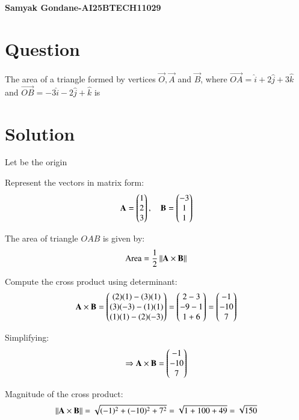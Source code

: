 \documentclass{article}
\begin{document}
\begin{center}
\large
    \textbf{Samyak Gondane-AI25BTECH11029}
\end{center}
\date{}

\section*{Question}
The area of a triangle formed by vertices $\vec{O}, \vec{A}$ and $\vec{B}$, where $\vec{OA} = \hat{i} + 2\hat{j} + 3\hat{k}$ and $\vec{OB} = -3\hat{i} - 2\hat{j} + \hat{k}$ is


\section*{Solution}

Let  be the origin

Represent the vectors in matrix form:
\begin{align}
\mathbf{A} = \begin{pmatrix}1 \\ 2 \\ 3\end{pmatrix}, \quad
\mathbf{B} = \begin{pmatrix}-3 \\ 1 \\ 1\end{pmatrix}
\end{align}

The area of triangle $OAB$ is given by:
\begin{align}
\text{Area} = \frac{1}{2} \left\lVert\mathbf{A} \times \mathbf{B}\right\rVert
\end{align}

Compute the cross product using determinant:
\begin{align}
\mathbf{A} \times \mathbf{B} =
\begin{pmatrix}
(2)(1) - (3)(1) \\
(3)(-3) - (1)(1) \\
(1)(1) - (2)(-3)
\end{pmatrix}
=
\begin{pmatrix}
2 - 3 \\
-9 - 1 \\
1 + 6
\end{pmatrix}
=
\begin{pmatrix}
-1 \\
-10 \\
7
\end{pmatrix}
\end{align}

Simplifying:
\begin{align}
\Rightarrow \mathbf{A} \times \mathbf{B} = \begin{pmatrix}-1 \\ -10 \\ 7\end{pmatrix}
\end{align}

Magnitude of the cross product:
\begin{align}
\left\lVert\mathbf{A} \times \mathbf{B}\right\rVert = \sqrt{(-1)^2 + (-10)^2 + 7^2} = \sqrt{1 + 100 + 49} = \sqrt{150}
\end{align}
\end{document}
